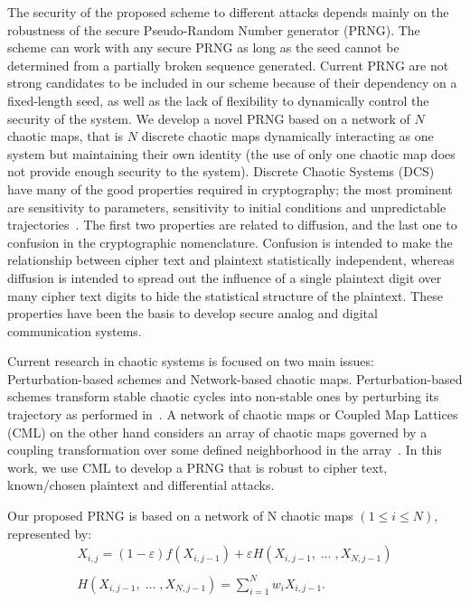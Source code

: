 \documentclass[preprint]{elsarticle}
\begin{document}
The security of the proposed scheme to different attacks depends mainly on the robustness of the secure Pseudo-Random Number generator (PRNG). The scheme can work with any secure PRNG as long as the seed cannot be determined from a partially broken sequence generated. Current PRNG are not strong candidates to be included in our scheme because of their dependency on a fixed-length seed, as well as the lack of flexibility to dynamically control the security of the system. We develop a novel PRNG based on a network of $N$ chaotic maps, that is $N$ discrete chaotic maps dynamically interacting as one system but maintaining their own identity (the use of only one chaotic map does not provide enough security to the system). Discrete Chaotic Systems (DCS) have many of the good properties required in cryptography; the most prominent are sensitivity to parameters, sensitivity to initial conditions and unpredictable trajectories~\cite{Meyer1995}. The first two properties are related to diffusion, and the last one to confusion in the cryptographic nomenclature. Confusion is intended to make the relationship between cipher text and plaintext statistically independent, whereas diffusion is intended to spread out the influence of a single plaintext digit over many cipher text digits to hide the statistical structure of the plaintext. These properties have been the basis to develop secure analog and digital communication systems.

Current research in chaotic systems is focused on two main issues: \\Perturbation-based schemes and Network-based chaotic maps. Perturbation-based schemes transform stable chaotic cycles into non-stable ones by perturbing its trajectory as performed in~\cite{Meyer1995}. A network of chaotic maps or Coupled Map Lattices (CML) on the other hand considers an array of chaotic maps governed by a coupling transformation over some defined neighborhood in the array~\cite{Hasimoto2008}. In this work, we use CML to develop a PRNG that is robust to cipher text, known/chosen plaintext and differential attacks.

Our proposed PRNG is based on a network of N chaotic maps $(1 \leq i \leq N)$, represented by:
\begin{equation}
\begin{array}{c}
\displaystyle{
X_{i,j}= (1-\varepsilon)f(X_{i,j-1})+ \varepsilon H(X_{i,j-1},\; \ldots \;,X_{N,j-1 } )
}
 \\ \\
\displaystyle{
H(X_{i,j-1},\; \ldots \;,X_{N, j-1})= \sum_{i=1}^{N}w_{i}X_{i,j-1}.
}
\end{array}
\label{ec1}
\end{equation}
\end{document}
